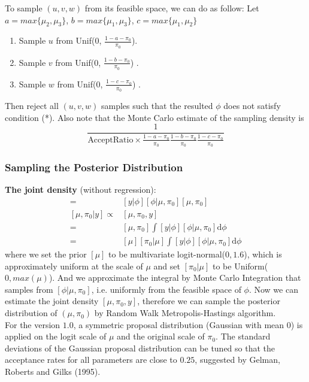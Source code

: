 \documentclass[11 pt, a4paper]{article}  %
\begin{document}
To sample $(u,v,w)$ from its feasible space, we can do as follow:
Let $a = max\{\mu_2,\mu_3\}$, $b = max\{\mu_1,\mu_3\}$, $c = max\{\mu_1,\mu_2\}$
\begin{enumerate}
\item Sample $u$ from Unif($0$, $\frac{1-a-\pi_0}{\pi_0}$).
\item Sample $v$ from Unif($0$, $\frac{1-b-\pi_0}{\pi_0}$) .
\item Sample $w$ from Unif($0$, $\frac{1-c-\pi_0}{\pi_0}$) .
\end{enumerate}
Then reject all $(u,v,w)$ samples such that the resulted  $\phi$ does not satisfy condition (*). Also note that the Monte Carlo estimate of the sampling density is 
\[\frac{1}{\text{AcceptRatio}\times \frac{1-a-\pi_0}{\pi_0}\frac{1-b-\pi_0}{\pi_0}\frac{1-c-\pi_0}{\pi_0}}\]

\newpage

\subsubsection{Sampling the Posterior Distribution}

{\bf The joint density} (without regression):
\begin{align*}
[y, \phi, \mu, \pi_0] = & [y|\phi] [\phi|\mu, \pi_0][\mu, \pi_0] \\
[\mu, \pi_0 | y] \propto & [\mu, \pi_0, y] \\
 = & [\mu, \pi_0] \int [y|\phi] [\phi|\mu, \pi_0] \text{d}\phi  \\
 = & [\mu] [\pi_0 | \mu] \int [y|\phi] [\phi|\mu, \pi_0] \text{d}\phi
\end{align*}
where we set the prior $[\mu]$ to be multivariate logit-normal($0,1.6$), which is approximately uniform at the scale of $\mu$ and set $[\pi_0 | \mu]$ to be Uniform($0,max(\mu)$).
And we approximate the integral by Monte Carlo Integration that samples from $[\phi|\mu, \pi_0]$, i.e. uniformly from the feasible space of $\phi$. Now we can estimate the joint density $[\mu, \pi_0, y]$, therefore we can sample the posterior distribution of $(\mu, \pi_0)$ by Random Walk Metropolis-Hastings algorithm.\\

For the version $1.0$, a symmetric proposal distribution (Gaussian with mean $0$) is applied on the logit scale of $\mu$ and the original scale of $\pi_0$. The standard deviations of the Gaussian proposal distribution can be tuned so that the acceptance rates for all parameters are close to $0.25$, suggested by Gelman, Roberts and Gilks (1995).\\
\end{document}
